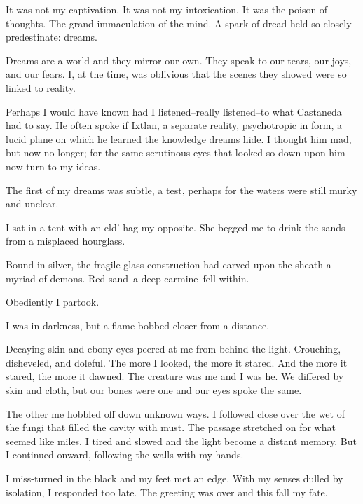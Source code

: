 \documentclass{article}
\begin{document}
It was not my captivation.
It was not my intoxication.
It was the poison of thoughts.
The grand immaculation of the mind.
A spark of dread held so closely predestinate: dreams.
\VV


\noindent
Dreams are a world and they mirror our own.
They speak to our tears, our joys, and our fears.
I, at the time, was oblivious that the scenes they
showed were so linked to reality.


Perhaps I would have known had I listened--really listened--to
what Castaneda had to say.
He often spoke if Ixtlan,
a separate reality,
psychotropic in form,
a lucid plane on which he learned the knowledge dreams hide.
I thought him mad, but now no longer;
for the same scrutinous eyes that looked so down upon him
now turn to my ideas.
\VV


\noindent
The first of my dreams was subtle, a test, perhaps
for the waters were still murky and unclear.
\VV


\noindent
I sat in a tent with an eld' hag my opposite.
She begged me to drink the sands from a misplaced hourglass.


Bound in silver, the fragile glass construction had
carved upon the sheath a myriad of demons.
Red sand--a deep carmine--fell within.


Obediently I partook.


\noindent
I was in darkness, but a flame bobbed closer from a distance.


Decaying skin and ebony eyes peered at me from behind the light.
Crouching, disheveled, and doleful.
The more I looked, the more it stared.
And the more it stared, the more it dawned.
The creature was me and I was he.
We differed by skin and cloth, but our bones were one
and our eyes spoke the same.


The other me hobbled off down unknown ways.
I followed close over the wet of the fungi that
filled the cavity with must.
The passage stretched on for what seemed like miles.
I tired and slowed and the light become a distant memory.
But I continued onward, following the walls with my hands.


I miss-turned in the black and my feet met an edge.
With my senses dulled by isolation, I responded too late.
The greeting was over and this fall my fate.
\end{document}
